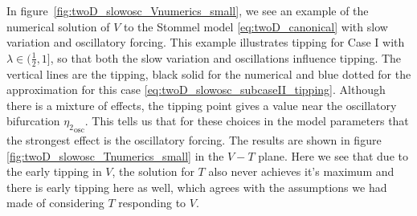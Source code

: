 In figure~\ref{fig:twoD_slowosc_Vnumerics_small}, we see an example of the numerical solution of $V$ to the Stommel model \eqref{eq:twoD_canonical} with slow variation and oscillatory forcing. This example illustrates tipping for Case I with $\lambda\in (\frac{1}{2},1]$, so that both the slow variation and oscillations influence tipping. The vertical lines are the tipping, black solid for the numerical and blue dotted for the approximation for this case \eqref{eq:twoD_slowosc_subcaseII_tipping}. Although there is a mixture of effects, the tipping point gives a value near the oscillatory bifurcation ${\eta_2}_{\text{osc}}$. This tells us that for these choices in the model parameters that the strongest effect is the oscillatory forcing. The results are shown in figure \eqref{fig:twoD_slowosc_Tnumerics_small} in the $V-T$ plane. Here we see that due to the early tipping in $V$, the solution for $T$ also never achieves it's maximum and there is early tipping here as well, which agrees with the assumptions we had made of considering $T$ responding to $V$.

